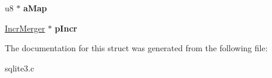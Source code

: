 \begin{DoxyCompactItemize}
\item 
u8 $\ast$ {\bfseries a\+Map}\hypertarget{structPmaReader_ad90dc0ec0c900dd21377c146ac73c73f}{}\label{structPmaReader_ad90dc0ec0c900dd21377c146ac73c73f}

\item 
\hyperlink{structIncrMerger}{Incr\+Merger} $\ast$ {\bfseries p\+Incr}\hypertarget{structPmaReader_a34569bea49de8122239eb40eaae8b10f}{}\label{structPmaReader_a34569bea49de8122239eb40eaae8b10f}

\end{DoxyCompactItemize}


The documentation for this struct was generated from the following file\+:\begin{DoxyCompactItemize}
\item 
sqlite3.\+c\end{DoxyCompactItemize}
